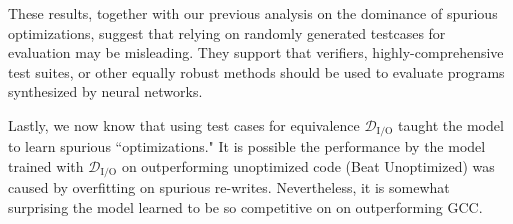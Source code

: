 \documentclass{article}
\def\correctfuncio/{\ensuremath{\mathcal{D}_\textrm{I/O}}}
\def\correctfuncsmt/{\ensuremath{\mathcal{D}_\textrm{verifier}}}
\begin{document}
These results, together with our previous analysis on the dominance of spurious optimizations, suggest that relying on randomly generated testcases for evaluation may be misleading. They support that verifiers, highly-comprehensive test suites, or other equally robust methods should be used to evaluate programs synthesized by neural networks. 


Lastly, we now know that using test cases for equivalence \correctfuncio/ taught the model to learn spurious ``optimizations." It is possible the performance by the model trained with \correctfuncio/ on outperforming unoptimized code (Beat Unoptimized) was caused by overfitting on spurious re-writes. Nevertheless, it is somewhat surprising the model learned to be so competitive on on outperforming GCC. 








\end{document}
